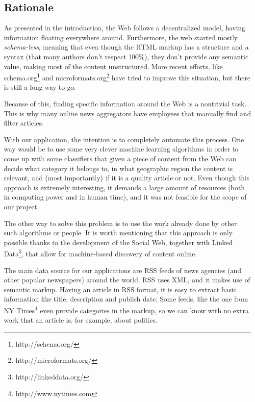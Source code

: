 \documentclass{acm_proc_10ptArticle-sp}
\begin{document}
\subsection{Rationale}

As presented in the introduction, the Web follows a decentralized model, having information floating everywhere around. Furthermore, the web started mostly \textit{schema-less}, meaning that even though the HTML markup has a structure and a syntax (that many authors don't respect 100\%), they don't provide any semantic value, making most of the content unstructured. More recent efforts, like schema.org\footnote{http://schema.org/} and microformats.org\footnote{http://microformats.org/} have tried to improve this situation, but there is still a long way to go.

Because of this, finding specific information around the Web is a nontrivial task. This is why many online news aggregators have employees that manually find and filter articles.

With our application, the intention is to completely automate this process. One way would be to use some very clever machine learning algorithms in order to come up with some classifiers that given a piece of content from the Web can decide what category it belongs to, in what geographic region the content is relevant, and (most importantly) if it is a quality article or not. Even though this approach is extremely interesting, it demands a large amount of resources (both in computing power and in human time), and it was not feasible for the scope of our project.

The other way to solve this problem is to use the work already done by other such algorithms or people. It is worth mentioning that this approach is only possible thanks to the development of the Social Web, together with Linked Data\footnote{http://linkeddata.org/}, that allow for machine-based discovery of content online.

The main data source for our applications are RSS feeds of news agencies (and other popular newspapers) around the world. RSS uses XML, and it makes use of semantic markup. Having an article in RSS format, it is easy to extract basic information like title, description and publish date. Some feeds, like the one from NY Times\footnote{http://www.nytimes.com} even provide categories in the markup, so we can know with no extra work that an article is, for example, about politics.
\end{document}
